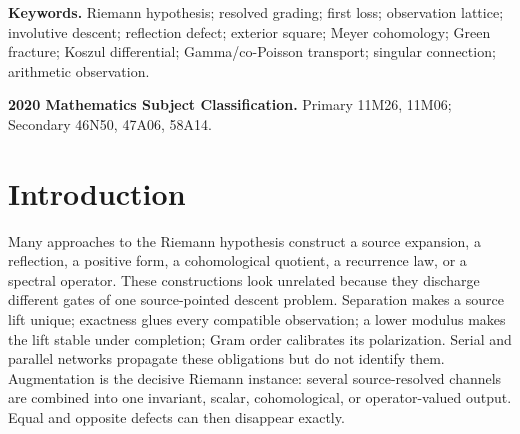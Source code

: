 \documentclass[11pt]{article}
\theoremstyle{definition}
\theoremstyle{remark}
\begin{document}
\begin{abstract}
The resolved-descent law now identifies the precise unsolved incidence.
The joint-depth Xi landing carries horizontal displacement only as a flat
endpoint gauge, whereas the physical prime curvature is source-defined but
not coupled to divisor displacement.  Multiplying any curved carrier by
\(H_a\) leaves every closed holonomy unchanged, so the obvious combination is
still horizontally blind; equivalently its entire relative-holonomy cocycle
\(\Theta_{a,b}\) is trivial.  What is absent is one source-derived,
nontrivial parametric holonomy transgression---equivalently a genuinely
nonseparable prime--depth--divisor incidence---whose singular common-test
extension obeys the Hodge symmetry or boundedness forced at the Xi divisor.
Regular self-dual Gamma envelopes cannot supply it: moderate self-dual data
with off-critical zeros exist, and the envelope preserves every right-half-
plane divisor and top conormal class.  Positive Gram completion, diagonal
weighting, finite-Rees transport, continuous or closable completion, and
fixed-carrier tensoring are likewise downstream gauges or quotients covered
by the law.  We therefore do not claim RH.  We prove instead that the
frontier is neither source construction nor positivity: it is the first
nonflat horizontal curvature class in the source-to-Xi descent.
\end{abstract}

\medskip
\noindent\textbf{Keywords.}
Riemann hypothesis; resolved grading; first loss; observation lattice; involutive descent; reflection defect;
exterior square; Meyer cohomology;
Green fracture; Koszul differential; Gamma/co-Poisson transport;
singular connection; arithmetic observation.

\medskip
\noindent\textbf{2020 Mathematics Subject Classification.}
Primary 11M26, 11M06; Secondary 46N50, 47A06, 58A14.

\section{Introduction}

Many approaches to the Riemann hypothesis construct a source expansion,
a reflection, a positive form, a cohomological quotient, a recurrence
law, or a spectral operator.  These constructions look unrelated because
they discharge different gates of one source-pointed descent problem.
Separation makes a source lift unique; exactness glues every compatible
observation; a lower modulus makes the lift stable under completion; Gram
order calibrates its polarization.  Serial and parallel networks propagate
these obligations but do not identify them.  Augmentation is the decisive
Riemann instance: several source-resolved channels are combined into one
invariant, scalar, cohomological, or operator-valued output.  Equal and
opposite defects can then disappear exactly.
\end{document}
